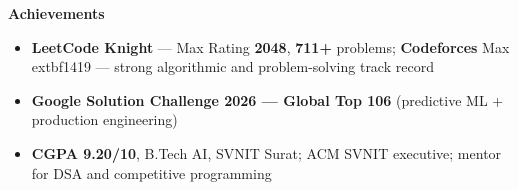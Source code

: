 \documentclass[a4paper,10pt]{article}
\newcommand{\cvsection}[1]{%
  \vspace{0.8mm}
  \begin{tcolorbox}
    \textbf{\large #1}
  \end{tcolorbox}
  \vspace{-4mm}
}
\begin{document}
\cvsection{Achievements}
\vspace{-1mm}
\begin{itemize}[leftmargin=3ex, rightmargin=2ex, noitemsep, labelsep=1.2mm, itemsep=0mm]\small
  \item \textbf{LeetCode Knight} --- Max Rating \textbf{2048}, \textbf{711+} problems; \textbf{Codeforces} Max 	extbf{1419} --- strong algorithmic and problem-solving track record
  \item \textbf{Google Solution Challenge 2026 --- Global Top 106} (predictive ML + production engineering)
  \item \textbf{CGPA 9.20/10}, B.Tech AI, SVNIT Surat; ACM SVNIT executive; mentor for DSA and competitive programming
\end{itemize}
\end{document}
